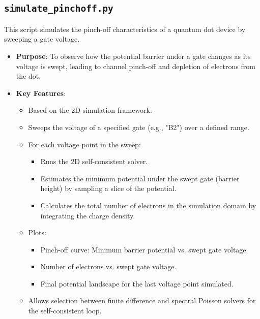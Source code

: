 \documentclass{article}
\begin{document}
\subsection{\texttt{simulate\_pinchoff.py}}
This script simulates the pinch-off characteristics of a quantum dot device by sweeping a gate voltage.
\begin{itemize}
    \item \textbf{Purpose}: To observe how the potential barrier under a gate changes as its voltage is swept, leading to channel pinch-off and depletion of electrons from the dot.
    \item \textbf{Key Features}:
        \begin{itemize}
            \item Based on the 2D simulation framework.
            \item Sweeps the voltage of a specified gate (e.g., "B2") over a defined range.
            \item For each voltage point in the sweep:
                \begin{itemize}
                    \item Runs the 2D self-consistent solver.
                    \item Estimates the minimum potential under the swept gate (barrier height) by sampling a slice of the potential.
                    \item Calculates the total number of electrons in the simulation domain by integrating the charge density.
                \end{itemize}
            \item Plots:
                \begin{itemize}
                    \item Pinch-off curve: Minimum barrier potential vs. swept gate voltage.
                    \item Number of electrons vs. swept gate voltage.
                    \item Final potential landscape for the last voltage point simulated.
                \end{itemize}
            \item Allows selection between finite difference and spectral Poisson solvers for the self-consistent loop.
        \end{itemize}
\end{itemize}
\end{document}
